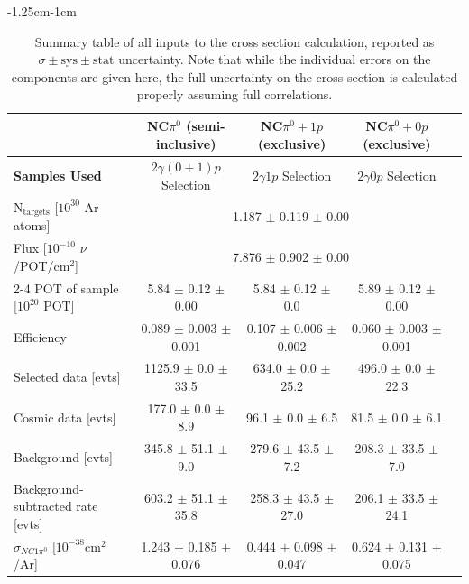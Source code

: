 \begin{table}[ht!]
    \caption{Summary table of all inputs to the cross section calculation, reported as  $\sigma \pm\text{sys}\pm \text{stat}$ uncertainty. Note that while the individual errors on the components are given here, the full uncertainty on the cross section is calculated properly assuming full correlations.}
    \begin{adjustwidth}{-1.25cm}{-1cm}
    \centering
    \setlength{\tabcolsep}{2pt}
    \begin{tabular}{|l|c|c|c|c|}
    \hline\hline
     \textbf{} & \textbf{NC$\pi^0$ (semi-inclusive)} & \textbf{NC$\pi^0+1 p$ (exclusive)} & \textbf{NC$\pi^0+0 p$ (exclusive)}  \\ \hline\hline
    \textbf{Samples Used} & {$2\gamma(0+1)p$ Selection } & $2\gamma1p$ Selection & $2\gamma0p$ Selection \\ \hline\hline

     N$_\text{targets}$ [$10^{30}$ Ar atoms]                    &
     \multicolumn{3}{c|}{1.187 $\pm$ 0.119 $\pm$ 0.00}                                                               \\
     Flux [$10^{-10}$ $\nu$/POT/cm$^{2}$]               & \multicolumn{3}{c|}{7.876 $\pm$ 0.902 $\pm$ 0.00}                                                               \\ \cline{2-4}
     POT of sample [$10^{20}$ POT]                      & 5.84    $\pm$ 0.12    $\pm$ 0.00   & 5.84     $\pm$ 0.12    $\pm$ 0.0      & 5.89    $\pm$ 0.12   $\pm$ 0.00    \\
	 Efficiency                                         & 0.089   $\pm$ 0.003   $\pm$ 0.001  & 0.107    $\pm$ 0.006   $\pm$ 0.002    & 0.060   $\pm$ 0.003  $\pm$ 0.001   \\
	 Selected data [evts]                              	& 1125.9  $\pm$ 0.0     $\pm$ 33.5   & 634.0    $\pm$ 0.0     $\pm$ 25.2     & 496.0   $\pm$ 0.0    $\pm$ 22.3    \\
	 Cosmic data [evts]                                      & 177.0   $\pm$ 0.0     $\pm$ 8.9    & 96.1     $\pm$ 0.0     $\pm$ 6.5      & 81.5    $\pm$ 0.0    $\pm$ 6.1     \\
	 Background [evts]                                         & 345.8   $\pm$ 51.1    $\pm$ 9.0    & 279.6    $\pm$ 43.5    $\pm$ 7.2      & 208.3   $\pm$ 33.5   $\pm$ 7.0     \\
	 Background-subtracted rate [evts]                        	& 603.2   $\pm$ 51.1    $\pm$ 35.8   & 258.3    $\pm$ 43.5    $\pm$ 27.0     & 206.1   $\pm$ 33.5   $\pm$ 24.1    \\ \hline
	 $\sigma_{NC1\pi^0}$ [$10^{-38}$cm$^2$/Ar]          & 1.243   $\pm$ 0.185   $\pm$ 0.076  & 0.444    $\pm$ 0.098   $\pm$ 0.047    & 0.624   $\pm$ 0.131  $\pm$ 0.075   \\
    \hline\hline
    \end{tabular}
    \end{adjustwidth}
    \label{tab:summary_tab}
\end{table}

